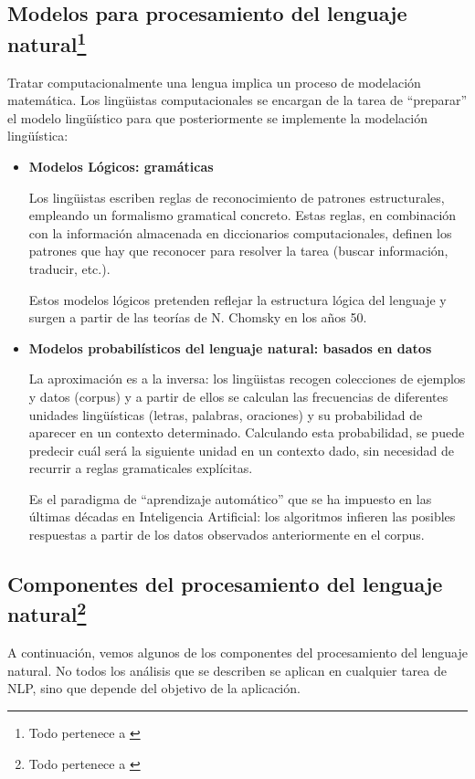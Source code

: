 \documentclass[runningheads]{llncs}
\begin{document}
\subsection{Modelos para procesamiento del lenguaje natural\protect\footnote{Todo pertenece a \cite{nlp}}}

Tratar computacionalmente una lengua implica un proceso de modelación matemática. Los lingüistas computacionales se encargan de la tarea de “preparar” el modelo lingüístico para que posteriormente se implemente la modelación lingüística:
\begin{itemize}


\item{\textbf{Modelos Lógicos: gramáticas}

Los lingüistas escriben reglas de reconocimiento de patrones estructurales, empleando un formalismo gramatical concreto. Estas reglas, en combinación con la información almacenada en diccionarios computacionales, definen los patrones que hay que reconocer para resolver la tarea (buscar información, traducir, etc.).

Estos modelos lógicos pretenden reflejar la estructura lógica del lenguaje y surgen a partir de las teorías de N. Chomsky en los años 50.} 


\item{\textbf{Modelos probabilísticos del lenguaje natural: basados en datos}

La aproximación es a la inversa: los lingüistas recogen colecciones de ejemplos y datos (corpus) y a partir de ellos se calculan las frecuencias de diferentes unidades lingüísticas (letras, palabras, oraciones) y su probabilidad de aparecer en un contexto determinado. Calculando esta probabilidad, se puede predecir cuál será la siguiente unidad en un contexto dado, sin necesidad de recurrir a reglas gramaticales explícitas.

Es el paradigma de “aprendizaje automático” que se ha impuesto en las últimas décadas en Inteligencia Artificial: los algoritmos infieren las posibles respuestas a partir de los datos observados anteriormente en el corpus.}
\end{itemize}

\subsection{Componentes del procesamiento del lenguaje natural\protect\footnote{Todo pertenece a \cite{nlp}}}

A continuación, vemos algunos de los componentes del procesamiento del lenguaje natural. No todos los análisis que se describen se aplican en cualquier tarea de NLP, sino que depende del objetivo de la aplicación.
\end{document}
